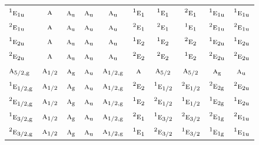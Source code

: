 \documentclass[10pt,a4paper]{article}
\numberwithin{equation}{section}
\newcommand{\irr}[1]{\text{\normalfont\scshape #1}}
\newcommand{\conjpair}[1]{{}^{#1}}
\newcommand{\ptag}[1]{\mathrm{#1}}
\begin{document}
{\begin{longtable}{@{}lccccccccc@{}}
$\conjpair{1}\irr{e}_{1\ptag{u}}$ & $\irr{a}$ & $\irr{a}_{\ptag{u}}$ & $\irr{a}_{\ptag{u}}$ & $\irr{a}_{\ptag{u}}$ & $\conjpair{1}\irr{e}_{1}$ & $\conjpair{1}\irr{e}_{1}$ & $\conjpair{2}\irr{e}_{1}$ & $\conjpair{1}\irr{e}_{1\ptag{u}}$ & $\conjpair{1}\irr{e}_{1\ptag{u}}$\\
$\conjpair{2}\irr{e}_{1\ptag{u}}$ & $\irr{a}$ & $\irr{a}_{\ptag{u}}$ & $\irr{a}_{\ptag{u}}$ & $\irr{a}_{\ptag{u}}$ & $\conjpair{2}\irr{e}_{1}$ & $\conjpair{2}\irr{e}_{1}$ & $\conjpair{1}\irr{e}_{1}$ & $\conjpair{2}\irr{e}_{1\ptag{u}}$ & $\conjpair{2}\irr{e}_{1\ptag{u}}$\\
$\conjpair{1}\irr{e}_{2\ptag{u}}$ & $\irr{a}$ & $\irr{a}_{\ptag{u}}$ & $\irr{a}_{\ptag{u}}$ & $\irr{a}_{\ptag{u}}$ & $\conjpair{1}\irr{e}_{2}$ & $\conjpair{1}\irr{e}_{2}$ & $\conjpair{2}\irr{e}_{2}$ & $\conjpair{1}\irr{e}_{2\ptag{u}}$ & $\conjpair{1}\irr{e}_{2\ptag{u}}$\\
$\conjpair{2}\irr{e}_{2\ptag{u}}$ & $\irr{a}$ & $\irr{a}_{\ptag{u}}$ & $\irr{a}_{\ptag{u}}$ & $\irr{a}_{\ptag{u}}$ & $\conjpair{2}\irr{e}_{2}$ & $\conjpair{2}\irr{e}_{2}$ & $\conjpair{1}\irr{e}_{2}$ & $\conjpair{2}\irr{e}_{2\ptag{u}}$ & $\conjpair{2}\irr{e}_{2\ptag{u}}$\\
$\irr{a}_{5/2,\ptag{g}}$ & $\irr{a}_{1/2}$ & $\irr{a}_{\ptag{g}}$ & $\irr{a}_{\ptag{u}}$ & $\irr{a}_{1/2,\ptag{g}}$ & $\irr{a}$ & $\irr{a}_{5/2}$ & $\irr{a}_{5/2}$ & $\irr{a}_{\ptag{g}}$ & $\irr{a}_{\ptag{u}}$\\
$\conjpair{1}\irr{e}_{1/2,\ptag{g}}$ & $\irr{a}_{1/2}$ & $\irr{a}_{\ptag{g}}$ & $\irr{a}_{\ptag{u}}$ & $\irr{a}_{1/2,\ptag{g}}$ & $\conjpair{2}\irr{e}_{2}$ & $\conjpair{1}\irr{e}_{1/2}$ & $\conjpair{2}\irr{e}_{1/2}$ & $\conjpair{2}\irr{e}_{2\ptag{g}}$ & $\conjpair{2}\irr{e}_{2\ptag{u}}$\\
$\conjpair{2}\irr{e}_{1/2,\ptag{g}}$ & $\irr{a}_{1/2}$ & $\irr{a}_{\ptag{g}}$ & $\irr{a}_{\ptag{u}}$ & $\irr{a}_{1/2,\ptag{g}}$ & $\conjpair{1}\irr{e}_{2}$ & $\conjpair{2}\irr{e}_{1/2}$ & $\conjpair{1}\irr{e}_{1/2}$ & $\conjpair{1}\irr{e}_{2\ptag{g}}$ & $\conjpair{1}\irr{e}_{2\ptag{u}}$\\
$\conjpair{1}\irr{e}_{3/2,\ptag{g}}$ & $\irr{a}_{1/2}$ & $\irr{a}_{\ptag{g}}$ & $\irr{a}_{\ptag{u}}$ & $\irr{a}_{1/2,\ptag{g}}$ & $\conjpair{2}\irr{e}_{1}$ & $\conjpair{1}\irr{e}_{3/2}$ & $\conjpair{2}\irr{e}_{3/2}$ & $\conjpair{2}\irr{e}_{1\ptag{g}}$ & $\conjpair{2}\irr{e}_{1\ptag{u}}$\\
$\conjpair{2}\irr{e}_{3/2,\ptag{g}}$ & $\irr{a}_{1/2}$ & $\irr{a}_{\ptag{g}}$ & $\irr{a}_{\ptag{u}}$ & $\irr{a}_{1/2,\ptag{g}}$ & $\conjpair{1}\irr{e}_{1}$ & $\conjpair{2}\irr{e}_{3/2}$ & $\conjpair{1}\irr{e}_{3/2}$ & $\conjpair{1}\irr{e}_{1\ptag{g}}$ & $\conjpair{1}\irr{e}_{1\ptag{u}}$\\

\end{longtable}}
\end{document}

